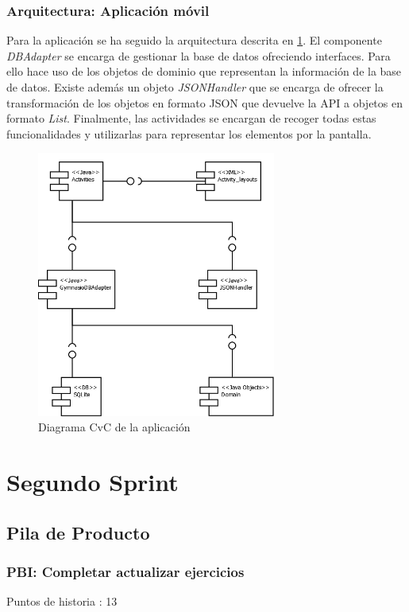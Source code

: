\documentclass[11pt,a4paper]{report}
\begin{document}
\subsubsection{Arquitectura: Aplicación móvil}
Para la aplicación se ha seguido la arquitectura descrita en \ref{fig: CvCApp}. El componente \textit{DBAdapter} se encarga de gestionar la base de datos ofreciendo interfaces. Para ello hace uso de los objetos de dominio que representan la información de la base de datos. Existe además un objeto \textit{JSONHandler} que se encarga de ofrecer la transformación de los objetos en formato JSON que devuelve la API a objetos en formato \textit{List}.
Finalmente, las actividades se encargan de recoger todas estas funcionalidades y utilizarlas para representar los elementos por la pantalla.
\begin{figure}[H]
	\centering
	\includegraphics[width=0.7\textwidth]{capturicas/CvCApp.png}
	\caption{Diagrama CvC de la aplicación}
	\label{fig: CvCApp}
\end{figure}
\section{Segundo Sprint}
\subsection{Pila de Producto}
\subsubsection{PBI: Completar actualizar ejercicios}
Puntos de historia : 13
\end{document}
